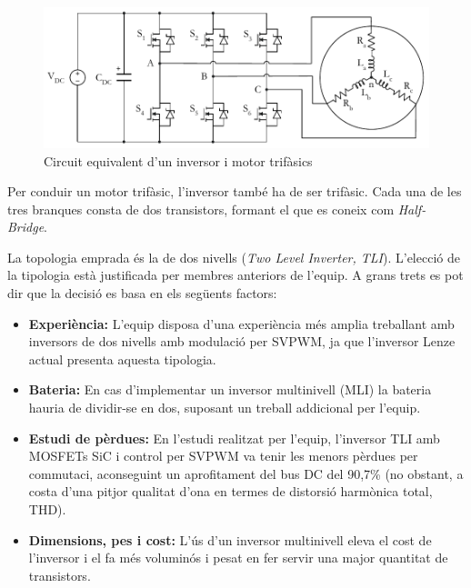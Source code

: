 {    \begin{figure}[!htb]
        \centering
        \captionsetup{justification=centering,margin=1.5cm}
        \includegraphics[width=12cm]
            { img/3_control_motor/inverter.pdf }
        \caption{ Circuit equivalent d'un inversor i motor trifàsics }
    \end{figure}

    Per conduir un motor trifàsic, l'inversor també ha de ser trifàsic. Cada
    una de les tres branques consta de dos transistors, formant el que
    es coneix com \emph{Half-Bridge}.
    
    La topologia emprada és la de dos nivells (\emph{Two Level Inverter, TLI}).
    L'elecció de la tipologia està justificada per membres anteriors de
    l'equip. A grans trets es pot dir que la decisió es basa en els següents
    factors:
    
    \begin{itemize}
        \item \textbf{Experiència:}
            L'equip disposa d'una experiència més amplia treballant amb
            inversors de dos nivells amb modulació per \ac{SVPWM}, ja que
            l'inversor Lenze actual presenta aquesta tipologia.

        \item \textbf{Bateria:}
            En cas d'implementar un inversor multinivell (MLI) la bateria
            hauria de dividir-se en dos, suposant un treball addicional per
            l'equip.

        \item \textbf{Estudi de pèrdues:}
            En l'estudi realitzat per l'equip, l'inversor TLI amb MOSFETs SiC i
            control per SVPWM va tenir les menors pèrdues per commutaci,
            aconseguint un aprofitament del bus DC del 90,7\% (no obstant, a
            costa d'una pitjor qualitat d'ona en termes de distorsió harmònica
            total, \acs{THD}).

        \item \textbf{Dimensions, pes i cost:}
            L'ús d'un inversor multinivell eleva el cost de l'inversor i el fa
            més voluminós i pesat en fer servir una major quantitat de
            transistors.

    \end{itemize}
}

